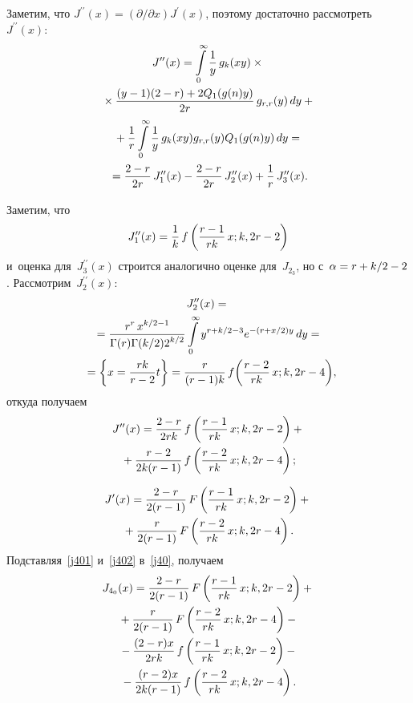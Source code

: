 \begin{multicols}{2}
Заметим, что $J^{\prime\prime}(x) = ({\partial}/{\partial x}) J^{\prime}(x)$, поэтому 
достаточно рассмотреть $J^{\prime\prime}(x)$:
\begin{multline*}
 J^{\prime\prime}(x) = \int\limits^{\infty}_{0}\fr{1}{y}\,g_k(xy) \times{}\\
 {}\times \fr{(y - 1)(2 - 
r) + 2 Q_1(g(n)y)}{2 r}\,g_{r,r}(y)\,dy +{} \\
{}+ \fr{1}{r}  \int\limits^{\infty}_{0} \fr{1}{y} \,g_k(xy) g_{r,r}(y) 
Q_1(g(n) y)\,dy =  {}\\
{}=
\fr{2-r}{2r}\,J_1^{\prime\prime}(x) - \fr{2-r}{2r}\,J_2^{\prime\prime}(x) + 
\fr{1}{r}\,J_3^{\prime\prime}(x).
\end{multline*}

Заметим, что 
$$
J_1^{\prime\prime}(x) = \fr{1}{k}\,f\left( \fr{r-1}{rk}\, x;k,2r-2\right)
$$
и~оценка для~$J_3^{\prime\prime}(x)$ строится аналогично оценке для~$J_{2_3}$, но 
с~$\alpha \hm= r\hm+k/2\hm-2$. Рассмотрим~$J_2^{\prime\prime}(x)$:
\begin{multline*}
J_2^{\prime\prime}(x) ={}\\
{}= \fr{r^r\,x^{k/2-1}}{\Gamma(r)\Gamma(k/2)2^{k/2}}\int\limits^{\infty}_{0} y^{r+k/2-3}
e^{-(r+x/2)y}\,dy ={} \\
{}= \left\{  x = \fr{rk}{r-2}t \right\} = \fr{r}{(r-1)k}\,f\!\left( \fr{r-2}{rk}\,x;k,2r-4\right)\!,\hspace*{-3.6227pt}
\end{multline*}
откуда получаем
\begin{multline}
\label{j401}
 J^{\prime\prime}(x) =  \fr{2-r}{2rk} \,f\left( \fr{r-1}{rk}\,x;k,2r-2\right) +{}\\
 {}+ \fr{r-2}{2k(r-1)}\,f\left( \fr{r-2}{rk}\, x;k,2r-4\right);
\end{multline}

\vspace*{-12pt}

\noindent
\begin{multline}
\label{j402}
 J^{\prime}(x) =  \fr{2-r}{2(r-1)}\, F\left( \fr{r-1}{rk}\, x;k,2r-2\right) + {}\\
 {}+
\fr{r}{2(r-1)}\,F\left( \fr{r-2}{rk} \,x;k,2r-4\right).
\end{multline}
Подставляя~\eqref{j401} и~\eqref{j402} в~\eqref{j40}, получаем
\begin{multline*}
 J_{4_0}(x) =  \fr{2-r}{2(r-1)}\, F\left( \fr{r-1}{rk}\, x;k,2r-2\right) + {}\\
 {}+
\fr{r}{2(r-1)}\,F\left( \fr{r-2}{rk}\, x;k,2r-4\right) -{} \\
{}-   \fr{(2-r)x}{2rk}\, f\left( \fr{r-1}{rk}\, x;k,2r-2\right) -{}\\
{}- \fr{(r-2)x}{2k(r-1)}\,f\left( \fr{r-2}{rk}\, x;k,2r-4\right).
\end{multline*}


\end{multicols}
